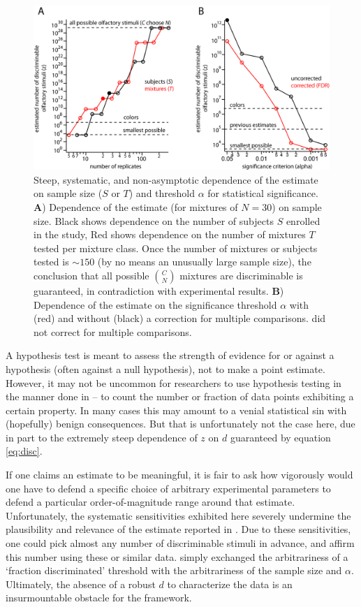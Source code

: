 \documentclass[letterpaper,twocolumn,10pt]{article}
\begin{document}
\begin{figure}[!hbt]
    \centering
    \includegraphics[width=1.0\textwidth]{figures/Fig8_T_alpha_dependency}
    \caption{
Steep, systematic, and non-asymptotic dependence of the estimate on sample size ($S$ or $T$) and threshold $\alpha$ for statistical significance. 
\textbf{A}) Dependence of the estimate (for mixtures of $N=30$) on sample size. 
Black shows dependence on the number of subjects $S$ enrolled in the study, 
Red shows dependence on the number of mixtures $T$ tested per mixture class. 
Once the number of mixtures or subjects tested is $\sim 150$ (by no means an unusually large sample size), 
the conclusion that all possible ${C \choose N}$ mixtures are discriminable is guaranteed, in contradiction with experimental results. 
\textbf{B}) Dependence of the estimate on the significance threshold $\alpha$ with (red) and without (black) a correction for multiple comparisons. 
\cite{bushdid_humans_2014} did not correct for multiple comparisons.}
    \label{fig:alpha_dependency}
\end{figure} 

A hypothesis test is meant to assess the strength of evidence for or against a hypothesis (often against a null hypothesis), not to make a point estimate.  
However, it may not be uncommon for researchers to use hypothesis testing in the manner done in \cite{bushdid_humans_2014} -- 
to count the number or fraction of data points exhibiting a certain property.  
In many cases this may amount to a venial statistical sin with (hopefully) benign consequences.  
But that is unfortunately not the case here, due in part to the extremely steep dependence of $z$ on $d$ guaranteed by equation \ref{eq:disc}. 

If one claims an estimate to be meaningful, 
it is fair to ask how vigorously would one have to defend a specific choice of arbitrary experimental parameters to defend a particular order-of-magnitude range around that estimate.
Unfortunately, the systematic sensitivities exhibited here severely undermine the plausibility and relevance of the estimate reported in \cite{bushdid_humans_2014}. 
Due to these sensitivities, one could pick almost any number of discriminable stimuli in advance, 
and affirm this number using these or similar data. 
\cite{bushdid_humans_2014} simply exchanged the arbitrariness of a `fraction discriminated' threshold with the arbitrariness of the sample size and $\alpha$. 
Ultimately, the absence of a robust $d$ to characterize the data is an insurmountable obstacle for the framework.   
\end{document}
